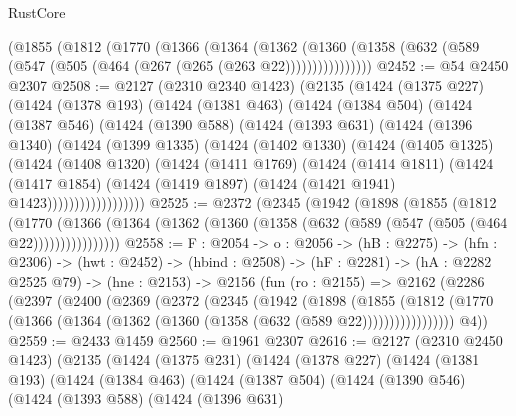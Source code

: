 \begin{lexlean}{RustCore}
\begin{coremodule}
    (@1855
      (@1812
        (@1770
          (@1366
            (@1364
              (@1362
                (@1360 (@1358 (@632 (@589 (@547 (@505 (@464 (@267 (@265 (@263 @22))))))))))))))))
@2452 := @54 @2450 @2307
@2508 := @2127
    (@2310 @2340 @1423)
    (@2135
      (@1424
        (@1375 @227)
        (@1424
          (@1378 @193)
          (@1424
            (@1381 @463)
            (@1424
              (@1384 @504)
              (@1424
                (@1387 @546)
                (@1424
                  (@1390 @588)
                  (@1424
                    (@1393 @631)
                    (@1424
                      (@1396 @1340)
                      (@1424
                        (@1399 @1335)
                        (@1424
                          (@1402 @1330)
                          (@1424
                            (@1405 @1325)
                            (@1424
                              (@1408 @1320)
                              (@1424
                                (@1411 @1769)
                                (@1424
                                  (@1414 @1811)
                                  (@1424
                                    (@1417 @1854)
                                    (@1424
                                      (@1419 @1897)
                                      (@1424 (@1421 @1941) @1423))))))))))))))))))
@2525 := @2372
    (@2345
      (@1942
        (@1898
          (@1855
            (@1812
              (@1770
                (@1366 (@1364 (@1362 (@1360 (@1358 (@632 (@589 (@547 (@505 (@464 @22))))))))))))))))
@2558 := {F : @2054} ->
  {o : @2056} ->
  (hB : @2275) ->
  (hfn : @2306) ->
  (hwt : @2452) ->
  (hbind : @2508) ->
  (hF : @2281) ->
  (hA : @2282 @2525 @79) ->
  (hne : @2153) ->
  @2156
    (fun (ro : @2155) =>
    @2162
      (@2286
        (@2397
          (@2400
            (@2369
              (@2372
                (@2345
                  (@1942
                    (@1898
                      (@1855
                        (@1812
                          (@1770 (@1366 (@1364 (@1362 (@1360 (@1358 (@632 (@589 @22)))))))))))))))))
        @4))
@2559 := @2433 @1459
@2560 := @1961 @2307
@2616 := @2127
    (@2310 @2450 @1423)
    (@2135
      (@1424
        (@1375 @231)
        (@1424
          (@1378 @227)
          (@1424
            (@1381 @193)
            (@1424
              (@1384 @463)
              (@1424
                (@1387 @504)
                (@1424
                  (@1390 @546)
                  (@1424
                    (@1393 @588)
                    (@1424
                      (@1396 @631)

\end{coremodule}
\end{lexlean}
